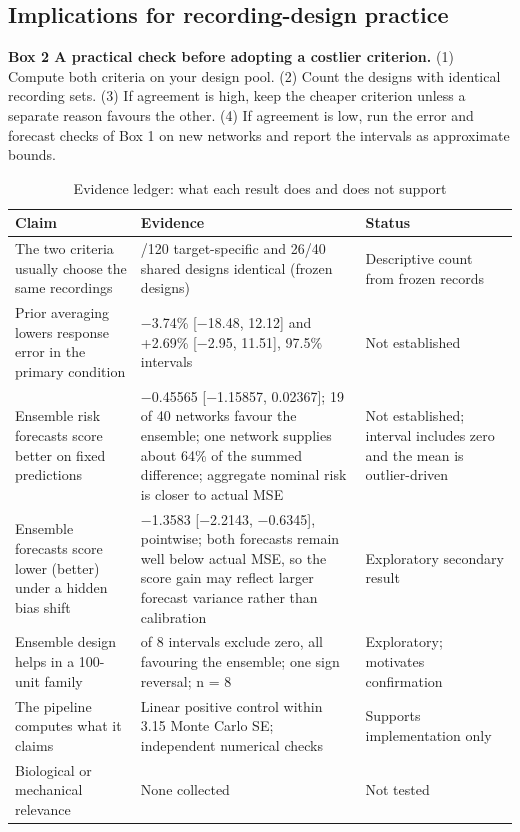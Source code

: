 \subsection{Implications for recording-design practice}

\textbf{Box 2 \textbar{} A practical check before adopting a costlier criterion.} (1) Compute both criteria on your design pool. (2) Count the designs with identical recording sets. (3) If agreement is high, keep the cheaper criterion unless a separate reason favours the other. (4) If agreement is low, run the error and forecast checks of Box 1 on new networks and report the intervals as approximate bounds.

\begin{table}[!tbp]
\setcounter{table}{1}
\caption{Evidence ledger: what each result does and does not support}
\label{tab:2}
\centering\small
\setlength{\tblw}{\dimexpr\textwidth-6\tabcolsep\relax}
\begin{tabular}{>{\raggedright\arraybackslash}p{0.1789\tblw}>{\raggedright\arraybackslash}p{0.4786\tblw}>{\raggedright\arraybackslash}p{0.3425\tblw}}
\toprule
Claim & Evidence & Status \\
\midrule
The two criteria usually choose the same recordings & 82/120 target-specific and 26/40 shared designs identical (frozen designs) & Descriptive count from frozen records \\
Prior averaging lowers response error in the primary condition & −3.74\% {[}−18.48, 12.12{]} and +2.69\% {[}−2.95, 11.51{]}, 97.5\% intervals & Not established \\
Ensemble risk forecasts score better on fixed predictions & −0.45565 {[}−1.15857, 0.02367{]}; 19 of 40 networks favour the ensemble; one network supplies about 64\% of the summed difference; aggregate nominal risk is closer to actual MSE & Not established; interval includes zero and the mean is outlier-driven \\
Ensemble forecasts score lower (better) under a hidden bias shift & −1.3583 {[}−2.2143, −0.6345{]}, pointwise; both forecasts remain well below actual MSE, so the score gain may reflect larger forecast variance rather than calibration & Exploratory secondary result \\
Ensemble design helps in a 100-unit family & 4 of 8 intervals exclude zero, all favouring the ensemble; one sign reversal; n = 8 & Exploratory; motivates confirmation \\
The pipeline computes what it claims & Linear positive control within 3.15 Monte Carlo SE; independent numerical checks & Supports implementation only \\
Biological or mechanical relevance & None collected & Not tested \\
\bottomrule
\end{tabular}
\end{table}

